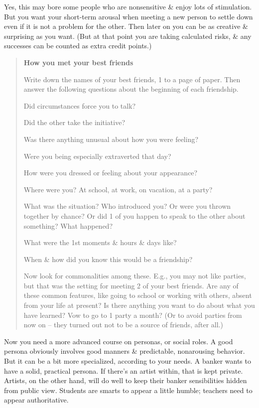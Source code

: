 \documentclass{article}
\numberwithin{equation}{section}
\begin{document}
Yes, this may bore some people who are nonsensitive \& enjoy lots of stimulation. But you want your short-term arousal when meeting a new person to settle down even if it is not a problem for the other. Then later on you can be as creative \& surprising as you want. (But at that point you are taking calculated risks, \& any successes can be counted as extra credit points.)
\begin{quotation}
	\textbf{How you met your best friends}
	
	Write down the names of your best friends, 1 to a page of paper. Then answer the following questions about the beginning of each friendship.
	
	Did circumstances force you to talk?
	
	Did the other take the initiative?
	
	Was there anything unusual about how you were feeling?
	
	Were you being especially extraverted that day?
	
	How were you dressed or feeling about your appearance?
	
	Where were you? At school, at work, on vacation, at a party?
	
	What was the situation? Who introduced you? Or were you thrown together by chance? Or did 1 of you happen to speak to the other about something? What happened?
	
	What were the 1st moments \& hours \& days like?
	
	When \& how did you know this would be a friendship?
	
	Now look for commonalities among these. E.g., you may not like parties, but that was the setting for meeting 2 of your best friends. Are any of these common features, like going to school or working with others, absent from your life at present? Is there anything you want to do about what you have learned? Vow to go to 1 party a month? (Or to avoid parties from now on -- they turned out not to be a source of friends, after all.)
\end{quotation}
Now you need a more advanced course on personas, or social roles. A good persona obviously involves good manners \& predictable, nonarousing behavior. But it can be a bit more specialized, according to your needs. A banker wants to have a solid, practical persona. If there's an artist within, that is kept private. Artists, on the other hand, will do well to keep their banker sensibilities hidden from public view. Students are smarts to appear a little humble; teachers need to appear authoritative.
\end{document}
